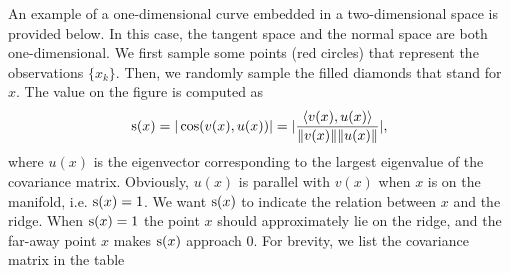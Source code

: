 \documentclass[aos,preprint]{imsart}
\theoremstyle{remark}
\begin{document}
An example of a one-dimensional curve embedded in a two-dimensional space is provided below. In this case, the tangent space and the normal space are both one-dimensional.
We first sample some points (red circles) that represent the observations $\{x_k\}$. Then, we randomly sample the filled diamonds that stand for $x$. The value on the figure is computed as
\[
{\rm s}(x) =  |\cos(v(x),u(x))| = |\frac{\langle v(x), u(x) \rangle}{\|v(x)\|\|u(x)\|}|,
\]
where $u(x)$ is the eigenvector corresponding to the largest eigenvalue of the covariance matrix. Obviously, $u(x)$ is parallel with $v(x)$ when $x$ is on the manifold, i.e. ${\rm s}(x)=1$. We want ${\rm s}(x)$ to indicate the relation between $x$ and the ridge. When ${\rm s}(x)=1$ the point $x$ should approximately lie on the ridge, and the far-away point $x$ makes ${\rm s}(x)$ approach $0$. 
For brevity, we list the covariance matrix in the table
% 
 \begin{table}
 
 \end{table}
 
\end{document}
